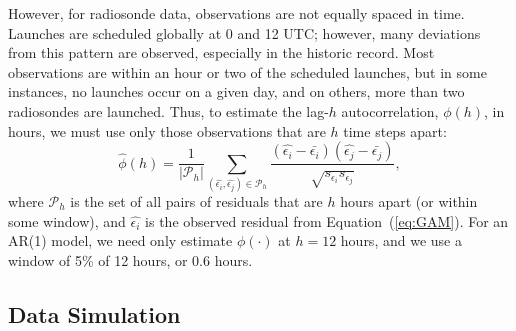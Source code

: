\documentclass[12pt]{article}
\def\ni{\noindent}
\begin{document}
\begin{doublespacing}
However, for radiosonde data, observations are not equally spaced in time.  Launches are scheduled globally at 0 and 12 UTC; however, many deviations from this pattern are observed, especially in the historic record.  Most observations are within an hour or two of the scheduled launches, but in some instances, no launches occur on a given day, and on others, more than two radiosondes are launched.   Thus, to estimate the lag-$h$  autocorrelation, ${\phi}(h)$, in hours, we must use only those observations that are $h$ time steps apart:
\begin{equation} \label{eq:ACF}
	\widehat{\phi}(h)=\frac{1}{\lvert \mathcal{P}_h\rvert} \sum_{(\widehat{\epsilon_i},\widehat{\epsilon_j}) \in \mathcal{P}_h} \frac{(\widehat{\epsilon_i}-\bar{\epsilon_i})(\widehat{\epsilon_j}-\bar{\epsilon_j})}{\sqrt{s_{\epsilon_i} s_{\epsilon_j}}},
\end{equation}
\ni where $\mathcal{P}_h$ is the set of all pairs of residuals that are $h$ hours apart (or within some window), and $\widehat{\epsilon_i}$ is the observed residual from Equation~(\ref{eq:GAM}).  For an AR(1) model, we need only estimate $\phi(\cdot)$ at $h=12$ hours, and we use a window of 5\% of 12 hours, or 0.6 hours.

\subsection{Data Simulation}
\label{ssec:sim}


\end{doublespacing}
\end{document}
